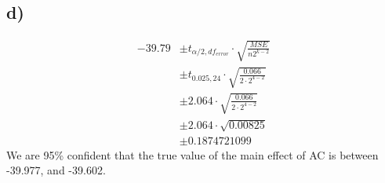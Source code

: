 \documentclass{article}
\begin{document}
\subsection*{d)}
\begin{align*}
    -39.79 &\pm t_{\alpha/2, df_{error}} \cdot \sqrt{\frac{MSE}{n2^{k-2}}}\\
           &\pm t_{0.025, 24} \cdot \sqrt{\frac{0.066}{2 \cdot 2^{4-2}}}\\
           &\pm 2.064 \cdot \sqrt{\frac{0.066}{2 \cdot 2^{4-2}}}\\
           &\pm 2.064 \cdot \sqrt{0.00825}\\
           &\pm 0.1874721099
\end{align*}
We are 95\% confident that the true value of the main effect of AC is between -39.977, and -39.602.
\end{document}
